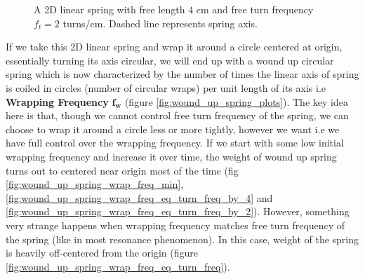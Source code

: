 \documentclass[11pt, a4paper]{article}
\begin{document}
	\begin{figure}[H]
		\centering
		
		\caption{A 2D linear spring with free length $4$ cm and free turn frequency $f_{t} = 2$ turns/cm. Dashed line represents spring axis.}
		\label{fig:2d_linear_spring_turn_fq_2}
	\end{figure}
	
	If we take this 2D linear spring and wrap it around a circle centered at origin, essentially turning its axis circular, we will end up with a wound up circular spring which is now characterized by the number of times the linear axis of spring is coiled in circles (number of circular wraps) per unit length of its axis i.e \textbf{Wrapping Frequency} $\boldsymbol{f_{w}}$ (figure \ref{fig:wound_up_spring_plots}). The key idea here is that, though we cannot control free turn frequency of the spring, we can choose to wrap it around a circle less or more tightly, however we want i.e we have full control over the wrapping frequency. If we start with some low initial wrapping frequency and increase it over time, the weight of wound up spring turns out to centered near origin most of the time (fig \ref{fig:wound_up_spring_wrap_freq_min}, \ref{fig:wound_up_spring_wrap_freq_eq_turn_freq_by_4} and \ref{fig:wound_up_spring_wrap_freq_eq_turn_freq_by_2}). However, something very strange happens when wrapping frequency matches free turn frequency of the spring (like in most resonance phenomenon). In this case, weight of the spring is heavily off-centered from the origin (figure \ref{fig:wound_up_spring_wrap_freq_eq_turn_freq}).
	
\end{document}
